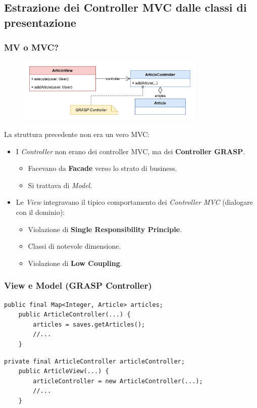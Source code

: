 \subsection{Estrazione dei Controller MVC dalle classi di presentazione}
\beamertitle

\begin{frame}
  \frametitle{MV o MVC?}
  \begin{figure}
    \includegraphics[width=0.8\textwidth]{img/MV.png}
  \end{figure}

  La struttura precedente {\color{red}non era un vero MVC}:
  \begin{itemize}
    \item I \emph{Controller} non erano dei controller MVC, ma dei \textbf{Controller GRASP}.
    \begin{itemize}
      \item Facevano da \textbf{Facade} verso lo strato di business.
      \item Si trattava di \emph{Model}.
    \end{itemize}
    \item Le \emph{View} integravano il tipico comportamento dei \emph{Controller MVC} (dialogare
    con il dominio):
    \begin{itemize}
      \item Violazione di \textbf{Single Responsibility Principle}.
      \item Classi di notevole dimensione.
      \item Violazione di \textbf{Low Coupling}.
    \end{itemize}
  \end{itemize}
\end{frame}

\begin{frame} [fragile]
    \frametitle{View e Model (GRASP Controller)}
    \begin{lstlisting}[autogobble, title={\texttt{ArticleController.java}}]
    public final Map<Integer, Article> articles;
    public ArticleController(...) {
        articles = saves.getArticles();
        //...
    }
    \end{lstlisting}
    \begin{lstlisting}[autogobble, title={\texttt{ArticleView.java}}]
    private final ArticleController articleController;
    public ArticleView(...) {
        articleController = new ArticleController(...);
        //...
    }
    \end{lstlisting}
\end{frame}

